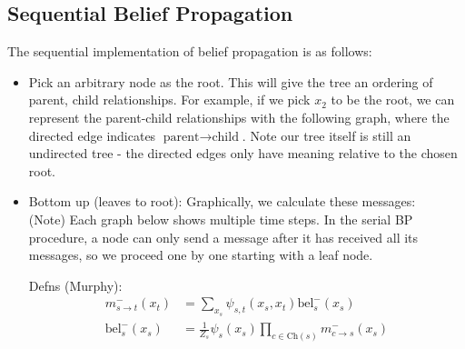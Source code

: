 \documentclass{harvardml}
\theoremstyle{definition}
\theoremstyle{plain}
\theoremstyle{definition}
\theoremstyle{remark}
\begin{document}
\subsection{Sequential Belief Propagation}
The sequential implementation of belief propagation is as follows:  
\begin{itemize}
    \item Pick an arbitrary node as the root. This will give the tree an ordering of parent, child relationships.
    For example, if we pick $x_2$ to be the root, we can represent the parent-child relationships with the following graph, where the directed edge indicates $\text{parent} \rightarrow \text{child}$. Note our tree itself is still an undirected tree - the directed edges only have meaning relative to the chosen root. 
    
    \begin{center}
    
\end{center}

    
    \item Bottom up (leaves to root): 
    Graphically, we calculate these messages:\\
    (Note) Each graph below shows multiple time steps. In the serial BP procedure, a node can only send a message after it has received all its messages, so we proceed one by one starting with a leaf node. 
    
\begin{center}
\end{center}

Defns (Murphy):
\begin{align*}m_{s\rightarrow t}^{-}(x_t) &= \sum_{x_s}\psi_{s,t}(x_s, x_t)\text{bel}_s^{-}(x_s)\\
\text{bel}_s^{-}(x_s) &= \frac{1}{Z_s}\psi_s(x_s)\prod_{c \in \text{Ch}(s)}m_{c\rightarrow s}^{-}(x_s)
\end{align*}


\end{itemize}
\end{document}
